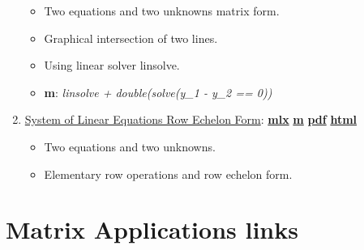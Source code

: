 \documentclass[
]{book}
\providecommand{\tightlist}{%
  \setlength{\itemsep}{0pt}\setlength{\parskip}{0pt}}
\begin{document}
\begin{enumerate}
  \begin{itemize}
  \tightlist
  \item
    Two equations and two unknowns matrix form.
  \item
    Graphical intersection of two lines.
  \item
    Using linear solver linsolve.
  \item
    \textbf{m}: \emph{linsolve + double(solve(y\_1 - y\_2 == 0))}
  \end{itemize}
\item
  \href{https://fanwangecon.github.io/Math4Econ/matrix_system_of_equations/htmlpdfm/matrix_row_echelon_form.html}{System of Linear Equations Row Echelon Form}: \href{https://github.com/FanWangEcon/Math4Econ/blob/master/matrix_system_of_equations/matrix_row_echelon_form.mlx}{\textbf{mlx}} \textbar{} \href{https://github.com/FanWangEcon/Math4Econ/blob/master/matrix_system_of_equations/htmlpdfm/matrix_row_echelon_form.m}{\textbf{m}} \textbar{} \href{https://github.com/FanWangEcon/Math4Econ/blob/master/matrix_system_of_equations/htmlpdfm/matrix_row_echelon_form.pdf}{\textbf{pdf}} \textbar{} \href{https://fanwangecon.github.io/Math4Econ/matrix_system_of_equations/htmlpdfm/matrix_row_echelon_form.html}{\textbf{html}}

  \begin{itemize}
  \tightlist
  \item
    Two equations and two unknowns.
  \item
    Elementary row operations and row echelon form.
  \end{itemize}
\end{enumerate}

\hypertarget{matrix-applications-links}{%
\section{Matrix Applications links}\label{matrix-applications-links}}
\end{document}
